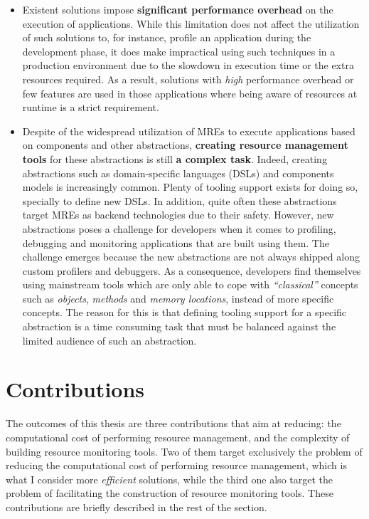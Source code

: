\begin{itemize}
\item Existent solutions impose \textbf{significant performance overhead} on the execution of applications.
While this limitation does not affect the utilization of such solutions to, for instance, profile an application during the development phase, it does make impractical using such techniques in a production environment due to the slowdown in execution time or the extra resources required.
As a result, solutions with \textit{high} performance overhead or few features are used in those applications where being aware of resources at runtime is a strict requirement.

\item Despite of the widespread utilization of MREs to execute applications based on components and other abstractions, \textbf{creating resource management tools} for these abstractions is still \textbf{a complex task}.
Indeed, creating abstractions such as domain-specific languages (DSLs) and components models is increasingly common.
Plenty of tooling support exists for doing so, specially to define new DSLs.
In addition, quite often these abstractions target MREs as backend technologies due to their safety.
However, new abstractions poses a challenge for developers when it comes to profiling, debugging and monitoring applications that are built using them.
The challenge emerges because the new abstractions are not always shipped along custom profilers and debuggers.
As a consequence, developers find themselves using mainstream tools which are only able to cope with \textit{``classical''} concepts such as \textit{objects}, \textit{methods} and \textit{memory locations}, instead of more specific concepts.
The reason for this is that defining tooling support for a specific abstraction is a time consuming task that must be balanced against the limited audience of such an abstraction.
\end{itemize}
 
\section{Contributions}

The outcomes of this thesis are three contributions that aim at reducing: the computational cost of performing resource management, and the complexity of building resource monitoring tools.
Two of them target exclusively the problem of reducing the computational cost of performing resource management, which is what I consider more \textit{efficient} solutions, while the third one also target the problem of facilitating the construction of resource monitoring tools. 
These contributions are briefly described in the rest of the section.

